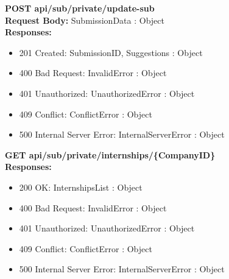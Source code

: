 \noindent\textbf{\color{titleColor}POST api/sub/private/update-sub}
\vspace{2pt}
\\\textbf{\color{titleColor}Request Body:} SubmissionData : Object 
\vspace{4pt}
\\\textbf{\color{titleColor}Responses:} 
\begin{itemize}
    \item {\color{titleColor}201 Created:} SubmissionID, Suggestions : Object
    \item {\color{titleColor}400 Bad Request:} InvalidError : Object
    \item {\color{titleColor}401 Unauthorized:} UnauthorizedError : Object
    \item {\color{titleColor}409 Conflict:} ConflictError : Object
    \item {\color{titleColor}500 Internal Server Error:} InternalServerError : Object
\end{itemize}
\vspace{10pt}
\noindent{\color{titleColor}\rule{0.8\linewidth}{0.2mm}}
\vspace{10pt}

\noindent\textbf{\color{titleColor}GET api/sub/private/internships/\{CompanyID\}}
\vspace{2pt}
\\\textbf{\color{titleColor}Responses:} 
\begin{itemize}
    \item {\color{titleColor}200 OK:} InternshipsList : Object
    \item {\color{titleColor}400 Bad Request:} InvalidError : Object
    \item {\color{titleColor}401 Unauthorized:} UnauthorizedError : Object
    \item {\color{titleColor}409 Conflict:} ConflictError : Object
    \item {\color{titleColor}500 Internal Server Error:} InternalServerError : Object
\end{itemize}
\vspace{10pt}
\noindent{\color{titleColor}\rule{0.8\linewidth}{0.2mm}}
\vspace{10pt}

